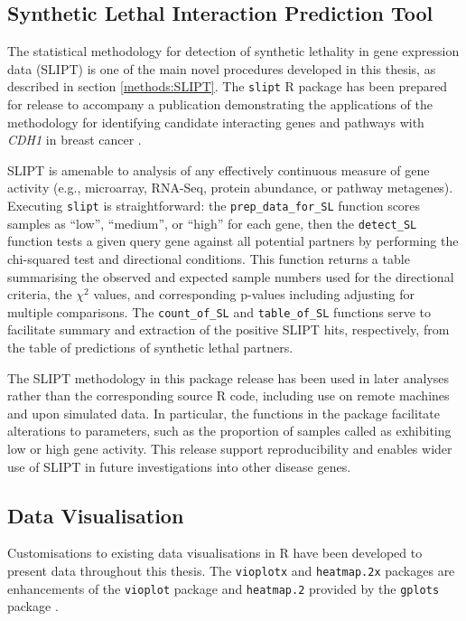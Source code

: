 \subsection{Synthetic Lethal Interaction Prediction Tool}
The statistical methodology for detection of synthetic lethality in gene expression data (SLIPT) is one of the main novel procedures developed in this thesis, as described in section \ref{methods:SLIPT}. The \texttt{slipt} R package has been prepared for release to accompany a publication demonstrating the applications of the methodology for identifying candidate interacting genes and pathways with \textit{CDH1} in breast cancer \citep{TCGA2012}.

SLIPT is amenable to analysis of any effectively continuous measure of gene activity (e.g., microarray, RNA-Seq, protein abundance, or pathway metagenes). Executing \texttt{slipt} is straightforward: the \texttt{prep\_data\_for\_SL} function scores samples as ``low'', ``medium'', or ``high'' for each gene, then the \texttt{detect\_SL} function tests a given query gene against all potential partners by performing the chi-squared test and directional conditions. This function returns a table summarising the observed and expected sample numbers used for the directional criteria, the $\chi^2$ values, and corresponding p-values including adjusting for multiple comparisons. The \texttt{count\_of\_SL} and \texttt{table\_of\_SL} functions serve to facilitate summary and extraction of the positive SLIPT hits, respectively, from the table of predictions of synthetic lethal partners.

The SLIPT methodology in this package release has been used in later analyses rather than the corresponding source R code, including use on remote machines and upon simulated data. In particular, the functions in the package facilitate alterations to parameters, such as the proportion of samples called as exhibiting low or high gene activity. This release support reproducibility and enables wider use of SLIPT in future investigations into other disease genes.

\subsection{Data Visualisation}
Customisations to existing data visualisations in R have been developed to present data throughout this thesis. The \texttt{vioplotx} and \texttt{heatmap.2x} packages are enhancements of the \texttt{vioplot} package \citep{vioplot} and \texttt{heatmap.2} provided by the \texttt{gplots} package \citep{gplots}. 

